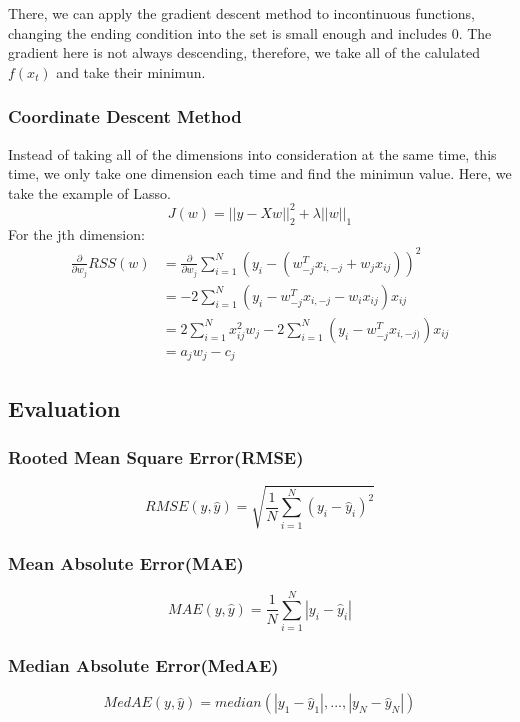 \documentclass{article}
\begin{document}
	There, we can apply the gradient descent method to incontinuous functions, changing the ending condition into the set is small enough and includes 0. The gradient here is not always descending, therefore, we take all of the calulated $f(x_{t})$ and take their minimun.
	\subsubsection{Coordinate Descent Method}
	Instead of taking all of the dimensions into consideration at the same time, this time, we only take one dimension each time and find the minimun value.
	Here, we take the example of Lasso.
	\begin{displaymath}
		J(w) = ||y - Xw||^2_2 + \lambda ||w||_1
	\end{displaymath}
	For the jth dimension:
	\begin{displaymath}\begin{aligned}
		\frac{\partial}{\partial w_j} RSS(w)
		&= \frac{\partial}{\partial w_j} \sum_{i=1}^{N}(y_i - (w_{-j}^Tx_{i,-j} + w_jx_{ij}))^2\\
		&= -2\sum_{i=1}^N (y_i - w^T_{-j}x_{i,-j} - w_ix_{ij})x_{ij}\\
		&= 2\sum_{i=1}^N x_{ij}^2w_j - 2\sum_{i=1}^N (y_i - w^T_{-j}x_{i,-j)})x_{ij}\\
		&=a_jw_j - c_j
	\end{aligned}
	\end{displaymath}
\subsection{Evaluation}
	\subsubsection{Rooted Mean Square Error(RMSE)}
	\begin{displaymath}
		RMSE(y,\hat{y}) = \sqrt{\frac{1}{N} \sum_{i=1}^{N}(y_i-\hat{y}_i)^2}
	\end{displaymath}
	\subsubsection{Mean Absolute Error(MAE)}
	\begin{displaymath}
		MAE(y,\hat{y}) = \frac{1}{N} \sum_{i=1}^{N}|y_i-\hat{y}_i|
	\end{displaymath}
	\subsubsection{Median Absolute Error(MedAE)}
	\begin{displaymath}
		MedAE(y,\hat{y}) = median(|y_1-\hat{y}_1|,...,|y_N-\hat{y}_N|)
	\end{displaymath}
\end{document}
